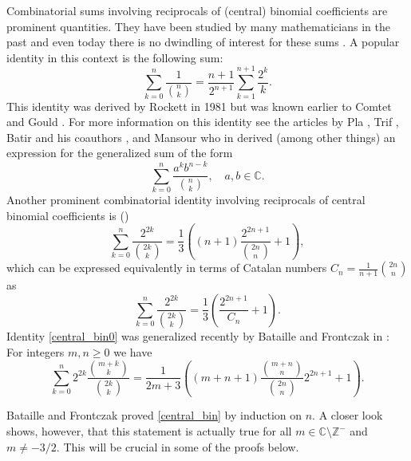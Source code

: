 \documentclass[11pt,reqno]{amsart}
\theoremstyle{plain}
\numberwithin{equation}{section}
\begin{document}
Combinatorial sums involving reciprocals of (central) binomial coefficients are prominent quantities.
They have been studied by many mathematicians in the past and even today there is no dwindling of interest for these sums 
\cite{Belbachir,Mansour,Sprugnoli,Sury,Witula}. A popular identity in this context is the following sum: 
\begin{equation}
\sum_{k=0}^n \frac{1}{\binom{n}{k}} = \frac{n+1}{2^{n+1}} \sum_{k=1}^{n+1} \frac{2^k}{k}.
\end{equation}
This identity was derived by Rockett in 1981 \cite{Rockett} but was known earlier to Comtet \cite[Page 294]{Comtet} 
and Gould \cite[Entry 2.25]{Gould}. For more information on this identity see the articles by Pla \cite{Pla}, Trif \cite{Trif}, 
Batir and his coauthors \cite{Batir1,Batir2,Batir3}, and Mansour who in \cite{Mansour} derived (among other things) an expression 
for the generalized sum of the form
\begin{equation*}
\sum_{k=0}^n \frac{a^k b^{n-k}}{\binom{n}{k}}, \quad a,b\in\mathbb{C}.
\end{equation*}
Another prominent combinatorial identity involving reciprocals of central binomial coefficients is (\cite{Adegoke1,Batir2,Sprugnoli,Witula})
\begin{equation}\label{central_bin0}
\sum_{k=0}^n  \frac{2^{2k}}{\binom{2k}{k}} = \frac{1}{3}\left ( (n+1)\frac{2^{2n+1}}{\binom{2n}{n}} + 1 \right ),
\end{equation}
which can be expressed equivalently in terms of Catalan numbers $C_n=\frac{1}{n+1}\binom{2n}{n}$ as
\begin{equation*}
\sum_{k=0}^n  \frac{2^{2k}}{\binom{2k}{k}} = \frac{1}{3}\left ( \frac{2^{2n+1}}{C_n} + 1 \right ).
\end{equation*}
Identity \eqref{central_bin0} was generalized recently by Bataille and Frontczak in \cite[Theorem 4.2]{Bataille}: 
For integers $m,n\ge 0$ we have 
\begin{equation}\label{central_bin}
\sum_{k=0}^n 2^{2k} \frac{\binom{m+k}{k}}{\binom{2k}{k}} 
= \frac{1}{2m+3}\left ( (m+n+1)\frac{\binom{m+n}{n}}{\binom{2n}{n}}2^{2n+1} + 1 \right ).
\end{equation}

Bataille and Frontczak proved \eqref{central_bin} by induction on $n$. A closer look shows, however, that this statement is actually true for all $m\in\mathbb C\setminus\mathbb Z^{-}$ and $m\neq -3/2$. This will be crucial in some of the proofs below.\\
\end{document}
